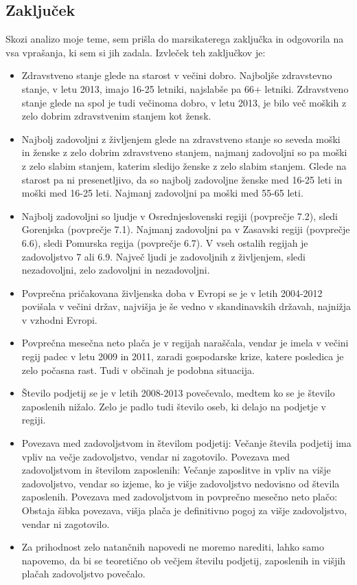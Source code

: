 \documentclass[11pt,a4paper]{article}
\begin{document}
\subsection{Zaključek}
Skozi analizo moje teme, sem prišla do marsikaterega zaključka in odgovorila na vsa vprašanja, ki sem si jih zadala. Izvleček teh zaključkov je:
\begin{itemize}
\item Zdravstveno stanje glede na starost v večini dobro. Najboljše zdravstevno stanje, v letu 2013,  imajo 16-25 letniki, najslabše pa 66+ letniki. Zdravstveno stanje glede na spol je tudi večinoma dobro, v letu 2013, je bilo več moških z zelo dobrim zdravstvenim stanjem kot žensk.
\item Najbolj zadovoljni z življenjem glede na zdravstveno stanje so seveda moški in ženske z zelo dobrim zdravstveno stanjem, najmanj zadovoljni so pa moški z zelo slabim stanjem, katerim sledijo ženske z zelo slabim stanjem. Glede na starost pa ni presenetljivo, da so najbolj zadovoljne ženske med 16-25 leti in moški med 16-25 leti. Najmanj zadovoljni pa moški med 55-65 leti.
\item Najbolj zadovoljni so ljudje v Osrednjeslovenski regiji (povprečje 7.2), sledi Gorenjska (povprečje 7.1). Najmanj zadovoljni pa v Zasavski regiji (povprečje 6.6), sledi Pomurska regija (povprečje 6.7). V vseh ostalih regijah je zadovoljstvo 7 ali 6.9. Največ ljudi je zadovoljnih z življenjem, sledi nezadovoljni, zelo zadovoljni in nezadovoljni.
\item Povprečna pričakovana življenska doba v Evropi se je v letih 2004-2012 povišala v večini držav, najvišja je še vedno v skandinavskih državah, najnižja v vzhodni Evropi.
\item Povprečna mesečna neto plača je v regijah naraščala, vendar je imela v večini regij padec v letu 2009 in 2011, zaradi gospodarske krize, katere posledica je zelo počasna rast. Tudi v občinah je podobna situacija.
\item Število podjetij se je v letih 2008-2013 povečevalo, medtem ko se je število zaposlenih nižalo. Zelo je padlo tudi število oseb, ki delajo na podjetje v regiji. 
\item Povezava med zadovoljstvom in številom podjetij: Večanje števila podjetij ima vpliv na večje zadovoljstvo, vendar ni zagotovilo. Povezava med zadovoljstvom in številom zaposlenih: Večanje zaposlitve in vpliv na višje zadovoljstvo, vendar so izjeme, ko je višje zadovoljstvo nedovisno od števila zaposlenih. Povezava med zadovoljstvom in povprečno mesečno neto plačo: Obstaja šibka povezava, višja plača je definitivno pogoj za višje zadovoljstvo, vendar ni zagotovilo.
\item Za prihodnost zelo natančnih napovedi ne moremo narediti, lahko samo napovemo, da bi se teoretično ob večjem številu podjetij, zaposlenih in višjih plačah zadovoljstvo povečalo.
\end{itemize}
\end{document}
